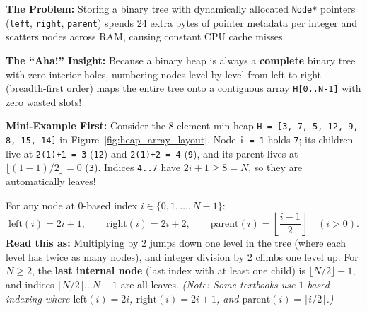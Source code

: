 \documentclass[11pt,a4paper]{article}
\theoremstyle{definition}
\newcommand{\painbeat}{\textbf{\color{accentamber}The Problem:} }
\newcommand{\ahabeat}{\textbf{\color{accentteal}The ``Aha!'' Insight:} }
\newcommand{\examplebeat}{\textbf{\color{primaryblue}Mini-Example First:} }
\begin{document}
\painbeat Storing a binary tree with dynamically allocated \texttt{Node*} pointers (\texttt{left}, \texttt{right}, \texttt{parent}) spends 24 extra bytes of pointer metadata per integer and scatters nodes across RAM, causing constant CPU cache misses.

\ahabeat Because a binary heap is always a \textbf{complete} binary tree with zero interior holes, numbering nodes level by level from left to right (breadth-first order) maps the entire tree onto a contiguous array \texttt{H[0..N-1]} with zero wasted slots!

\examplebeat Consider the 8-element min-heap \texttt{H = [3, 7, 5, 12, 9, 8, 15, 14]} in Figure~\ref{fig:heap_array_layout}. Node \texttt{i = 1} holds \texttt{7}; its children live at \texttt{2(1)+1 = 3} (\texttt{12}) and \texttt{2(1)+2 = 4} (\texttt{9}), and its parent lives at $\lfloor (1 - 1)/2 \rfloor = 0$ (\texttt{3}). Indices \texttt{4..7} have $2i + 1 \ge 8 = N$, so they are automatically leaves!

\begin{formulabox}
For any node at $0$-based index $i \in \{0, 1, \dots, N-1\}$:
$$\text{left}(i) = 2i + 1, \qquad \text{right}(i) = 2i + 2, \qquad \text{parent}(i) = \left\lfloor \frac{i - 1}{2} \right\rfloor \quad (i > 0).$$
\textbf{Read this as:} Multiplying by $2$ jumps down one level in the tree (where each level has twice as many nodes), and integer division by $2$ climbs one level up. For $N \ge 2$, the \textbf{last internal node} (last index with at least one child) is $\lfloor N / 2 \rfloor - 1$, and indices $\lfloor N / 2 \rfloor \dots N - 1$ are all leaves. \emph{(Note: Some textbooks use $1$-based indexing where $\text{left}(i) = 2i$, $\text{right}(i) = 2i+1$, and $\text{parent}(i) = \lfloor i/2 \rfloor$.)}
\end{formulabox}
\end{document}
